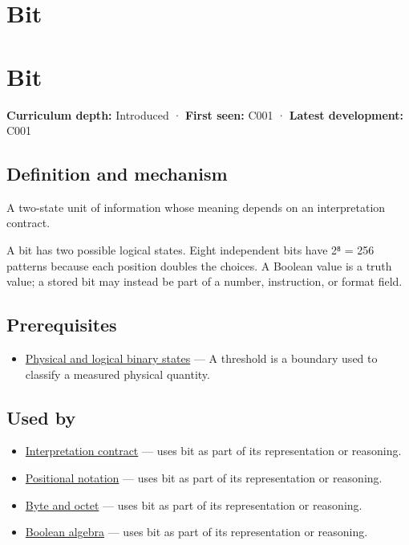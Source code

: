 \hypertarget{appendix-ddbb69998a2e}{}
\section*{Bit}
\section{Bit}\label{appendix-ddbb69998a2e-bit}

\textbf{Curriculum depth:} Introduced · \textbf{First seen:} C001 · \textbf{Latest development:} C001

\subsection{Definition and mechanism}\label{appendix-ddbb69998a2e-definition-and-mechanism}

A two-state unit of information whose meaning depends on an interpretation contract.

A bit has two possible logical states. Eight independent bits have 2⁸ = 256 patterns because each position doubles the choices. A Boolean value is a truth value; a stored bit may instead be part of a number, instruction, or format field.

\subsection{Prerequisites}\label{appendix-ddbb69998a2e-prerequisites}

\begin{itemize}
\tightlist
\item
  \hyperref[appendix-ea798b1ceb35]{Physical and logical binary states} --- A threshold is a boundary used to classify a measured physical quantity.
\end{itemize}

\subsection{Used by}\label{appendix-ddbb69998a2e-used-by}

\begin{itemize}
\tightlist
\item
  \hyperref[appendix-f414bd4ed05c]{Interpretation contract} --- uses bit as part of its representation or reasoning.
\item
  \hyperref[appendix-83c3f28f7bda]{Positional notation} --- uses bit as part of its representation or reasoning.
\item
  \hyperref[appendix-5bee2df85484]{Byte and octet} --- uses bit as part of its representation or reasoning.
\item
  \hyperref[appendix-24475e1596a8]{Boolean algebra} --- uses bit as part of its representation or reasoning.
\end{itemize}

